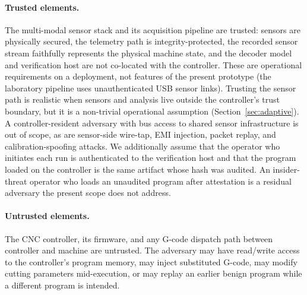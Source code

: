\documentclass[sensors,article,submit,moreauthors,pdftex]{Definitions/mdpi}
\begin{document}
\paragraph{Trusted elements.} The multi-modal sensor stack and its acquisition pipeline are trusted: sensors are physically secured, the telemetry path is integrity-protected, the recorded sensor stream faithfully represents the physical machine state, and the decoder model and verification host are not co-located with the controller. These are operational requirements on a deployment, not features of the present prototype (the laboratory pipeline uses unauthenticated USB sensor links). Trusting the sensor path is realistic when sensors and analysis live outside the controller's trust boundary, but it is a non-trivial operational assumption (Section~\ref{sec:adaptive}). A controller-resident adversary with bus access to shared sensor infrastructure is out of scope, as are sensor-side wire-tap, EMI injection, packet replay, and calibration-spoofing attacks. We additionally assume that the operator who initiates each run is authenticated to the verification host and that the program loaded on the controller is the same artifact whose hash was audited. An insider-threat operator who loads an unaudited program after attestation is a residual adversary the present scope does not address.

\paragraph{Untrusted elements.} The CNC controller, its firmware, and any G-code dispatch path between controller and machine are untrusted. The adversary may have read/write access to the controller's program memory, may inject substituted G-code, may modify cutting parameters mid-execution, or may replay an earlier benign program while a different program is intended.
\end{document}

